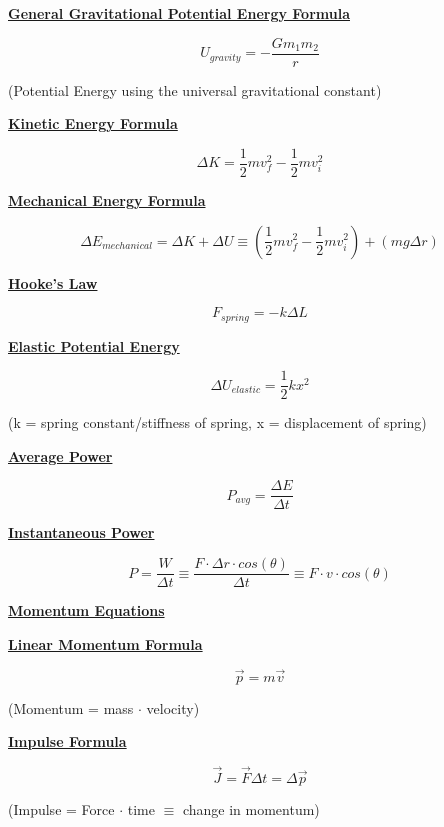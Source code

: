 \documentclass[12pt, letterpaper]{article}
\begin{document}
\normalsize{\centerline{\textbf{\underline{General Gravitational Potential Energy Formula}}}}
\[U_{gravity} = - \frac{G m_1 m_2}{r}\]
\small{\centerline{(Potential Energy using the universal gravitational constant)}}
\vspace{0.1em}

\normalsize{\centerline{\textbf{\underline{Kinetic Energy Formula}}}}
\[\Delta K = \frac{1}{2}mv^2_f - \frac{1}{2}mv^2_i\]

\normalsize{\centerline{\textbf{\underline{Mechanical Energy Formula}}}}
\[\Delta E_{mechanical} = \Delta K + \Delta U \equiv (\frac{1}{2}mv^2_f - \frac{1}{2}mv^2_i) + (mg \Delta r)\]

\normalsize{\centerline{\textbf{\underline{Hooke's Law}}}}
\[F_{spring} = -k \Delta L\]

\normalsize{\centerline{\textbf{\underline{Elastic Potential Energy}}}}
\[\Delta U_{elastic} = \frac{1}{2}kx^2\]
\small{\centerline{(k = spring constant/stiffness of spring, x = displacement of spring)}}
\vspace{0.1em}

\newpage

\normalsize{\centerline{\textbf{\underline{Average Power}}}}
\[P_{avg} = \frac{\Delta E}{\Delta t}\]

\normalsize{\centerline{\textbf{\underline{Instantaneous Power}}}}
\[P = \frac{W}{\Delta t} \equiv \frac{F \cdot \Delta r \cdot cos(\theta)}{\Delta t} \equiv F \cdot v \cdot cos(\theta)\]

\newpage


\Large{\centerline{\textbf{\underline{Momentum Equations}}}}
\vspace{1em}

\normalsize{\centerline{\textbf{\underline{Linear Momentum Formula}}}}
\[\vec{p} = m \vec{v}\]
\small{\centerline{(Momentum = mass $\cdot$ velocity)}}
\vspace{0.1em}

\normalsize{\centerline{\textbf{\underline{Impulse Formula}}}}
\[\vec{J} = \vec{F} \Delta t = \Delta \vec{p}\]
\small{\centerline{(Impulse = Force $\cdot$ time $\equiv$ change in momentum)}}
\vspace{0.1em}
\end{document}

